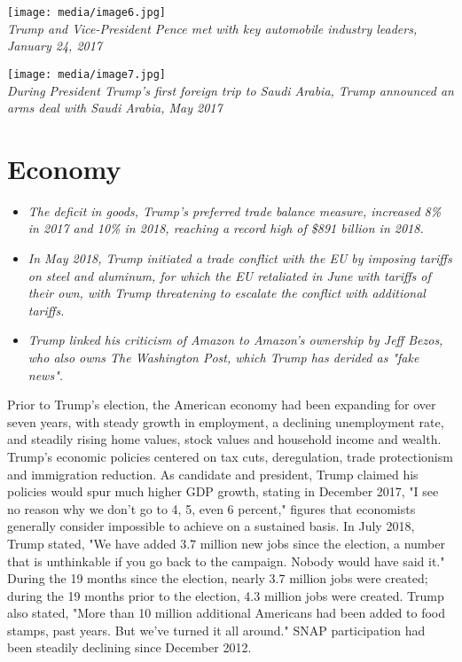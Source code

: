 \texttt{[image: media/image6.jpg]}\\
\emph{Trump and Vice-President Pence met with key automobile industry
leaders, January 24, 2017}

\texttt{[image: media/image7.jpg]}\\
\emph{During President Trump's first foreign trip to Saudi Arabia, Trump
announced an arms deal with Saudi Arabia, May 2017}

\section{Economy}\label{economy}

\begin{itemize}
\item
  \emph{The deficit in goods, Trump's preferred trade balance measure,
  increased 8\% in 2017 and 10\% in 2018, reaching a record high of
  \$891 billion in 2018.}
\item
  \emph{In May 2018, Trump initiated a trade conflict with the EU by
  imposing tariffs on steel and aluminum, for which the EU retaliated in
  June with tariffs of their own, with Trump threatening to escalate the
  conflict with additional tariffs.}
\item
  \emph{Trump linked his criticism of Amazon to Amazon's ownership by
  Jeff Bezos, who also owns The Washington Post, which Trump has derided
  as "fake news".}
\end{itemize}

Prior to Trump's election, the American economy had been expanding for
over seven years, with steady growth in employment, a declining
unemployment rate, and steadily rising home values, stock values and
household income and wealth. Trump's economic policies centered on tax
cuts, deregulation, trade protectionism and immigration reduction. As
candidate and president, Trump claimed his policies would spur much
higher GDP growth, stating in December 2017, "I see no reason why we
don't go to 4, 5, even 6 percent," figures that economists generally
consider impossible to achieve on a sustained basis. In July 2018, Trump
stated, "We have added 3.7 million new jobs since the election, a number
that is unthinkable if you go back to the campaign. Nobody would have
said it." During the 19 months since the election, nearly 3.7 million
jobs were created; during the 19 months prior to the election, 4.3
million jobs were created. Trump also stated, "More than 10 million
additional Americans had been added to food stamps, past years. But
we've turned it all around." SNAP participation had been steadily
declining since December 2012.

